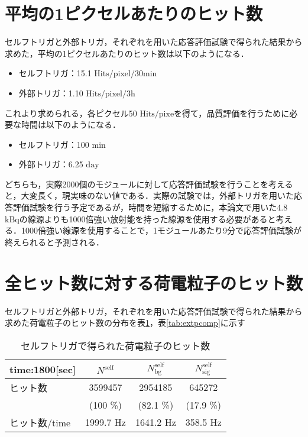 \section{平均の1ピクセルあたりのヒット数}
セルフトリガと外部トリガ，それぞれを用いた応答評価試験で得られた結果から求めた，平均の1ピクセルあたりのヒット数は以下のようになる．

\begin{itemize}
\item セルフトリガ：15.1 $\mathrm{Hits/pixel/30min}$\\
\item 外部トリガ：1.10 $\mathrm{Hits/pixel/3h}$
\end{itemize}

これより求められる，各ピクセル50 $\mathrm{Hits/pixe}$を得て，品質評価を行うために必要な時間は以下のようになる．
\begin{itemize}
\item セルフトリガ：100 $\mathrm{min}$\\
\item 外部トリガ：6.25 $\mathrm{day}$
\end{itemize}

どちらも，実際2000個のモジュールに対して応答評価試験を行うことを考えると，大変長く，現実味のない値である．実際の試験では，外部トリガを用いた応答評価試験を行う予定であるが，時間を短縮するために，本論文で用いた4.8 $\mathrm{kBq}$の線源よりも1000倍強い放射能を持った線源を使用する必要があると考える．1000倍強い線源を使用することで，1モジュールあたり9分で応答評価試験が終えられると予測される．

\section{全ヒット数に対する荷電粒子のヒット数}
セルフトリガと外部トリガ，それぞれを用いた応答評価試験で得られた結果から求めた荷電粒子のヒット数の分布を表\ref{tab:selfpcomp}，表\ref{tab:extpcomp}に示す

\begin{table}[h]
  \centering
  \caption{セルフトリガで得られた荷電粒子のヒット数}
  \begin{tabular} {l|ccc} \hline
    time:1800[sec]& $N^{\mathrm{self}}$ & $N_{\mathrm{bg}}^{\mathrm{self}}$ & $N_{\mathrm{sig}}^{\mathrm{self}}$ \\ \hline \hline
    ヒット数 & 3599457 & 2954185 & 645272 \\
    & (100 \%) & (82.1 \%) & (17.9 \%) \\ \hline
    ヒット数/time & 1999.7 $\mathrm{Hz}$ & 1641.2 $\mathrm{Hz}$ & 358.5 $\mathrm{Hz}$ \\ \hline
  \end{tabular}
  \label{tab:selfpcomp}
\end{table}

